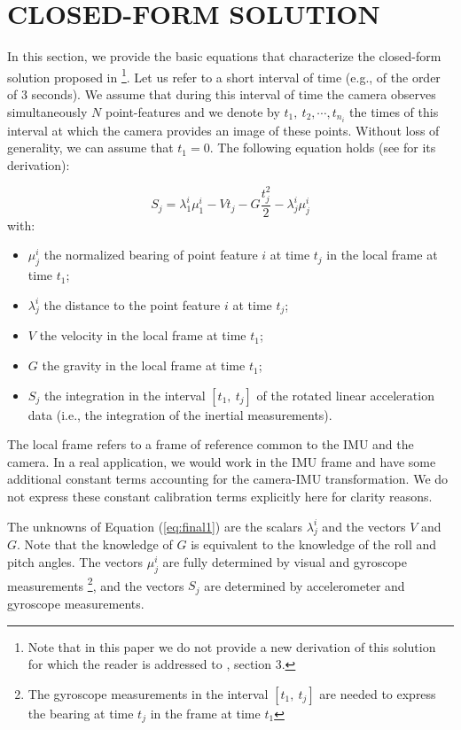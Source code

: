 \documentclass[letterpaper, 10pt, conference, final]{ieeeconf}  %
\begin{document}
\section{CLOSED-FORM SOLUTION}\label{SectionCFS}

In this section, we provide the basic equations that characterize the closed-form solution proposed in \cite{Martinelli2014}\footnote{Note that in this paper we do not provide a new derivation of this solution for which the reader is addressed to \cite{Martinelli2014}, section 3.}.
Let us refer to a short interval of time (e.g., of the order of $3$ seconds). We assume that during this interval of time the camera observes simultaneously $N$ point-features and we denote by $t_1,~t_2,\cdots,t_{n_i}$ the times of this interval at which the camera provides an image of these points. Without loss of generality, we can assume that $t_1=0$.
The following equation holds (see \cite{Martinelli2014} for its derivation):


\begin{equation} \label{eq:final1}
S_j = \lambda_1^i\mu_1^i - V t_j - G \frac{t_j^2}{2} - \lambda^i_j \mu^i_j
\end{equation}
\noindent with:
\begin{itemize}
\item $\mu_j^i$ the normalized bearing of point feature $i$ at time $t_j$ in the local frame at time $t_1$;
\item $\lambda_j^i$ the distance to the point feature $i$ at time $t_j$;
\item $V$ the velocity in the local frame at time $t_1$;
\item $G$ the gravity in the local frame  at time $t_1$;
\item $S_j$ the integration in the interval $[t_1, ~t_j]$ of the rotated linear acceleration data (i.e., the integration of the inertial measurements).
\end{itemize}


The local frame refers to a frame of reference common to the IMU and the camera.
In a real application, we would work in the IMU frame and have some additional constant terms
accounting for the camera-IMU transformation.
We do not express these constant calibration terms explicitly here for clarity reasons.

The unknowns of Equation (\ref{eq:final1}) are the scalars $\lambda_j^i$ and the vectors $V$ and $G$.
Note that the knowledge of $G$ is equivalent to the knowledge of the roll and pitch angles.
The vectors $\mu_j^i$ are fully determined by visual and gyroscope measurements \footnote{The gyroscope measurements in the interval $[t_1, ~t_j]$ are needed to express the bearing at time $t_j$ in the frame at time $t_1$},
and the vectors $S_j$ are determined by accelerometer and gyroscope measurements.
\end{document}
